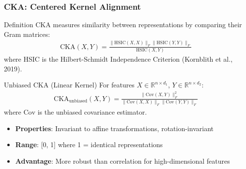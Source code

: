 \documentclass[aspectratio=1610, fontsize=8pt]{beamer}
\begin{document}
\begin{frame}
    \frametitle{CKA: Centered Kernel Alignment}
    \begin{block}{Definition}
        CKA measures similarity between representations by comparing their Gram matrices:
        \begin{align}
            \text{CKA}(X, Y) = \frac{\|\text{HSIC}(X, X)\|_F \|\text{HSIC}(Y, Y)\|_F}{\text{HSIC}(X, Y)}
        \end{align}
        where HSIC is the Hilbert-Schmidt Independence Criterion (Kornblith et al., 2019).
    \end{block}
    
    \begin{block}{Unbiased CKA (Linear Kernel)}
        For features $X \in \mathbb{R}^{n \times d_1}$, $Y \in \mathbb{R}^{n \times d_2}$:
        \begin{align}
            \text{CKA}_{\text{unbiased}}(X, Y) = \frac{\|\text{Cov}(X, Y)\|_F^2}{\|\text{Cov}(X, X)\|_F \|\text{Cov}(Y, Y)\|_F}
        \end{align}
        where $\text{Cov}$ is the unbiased covariance estimator.
    \end{block}
    
    \vspace{0.2cm}
    \begin{itemize}
        \item \textbf{Properties}: Invariant to affine transformations, rotation-invariant
        \item \textbf{Range}: [0, 1] where 1 = identical representations
        \item \textbf{Advantage}: More robust than correlation for high-dimensional features
    \end{itemize}
\end{frame}
\end{document}
